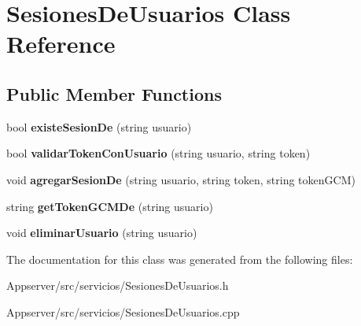 \hypertarget{classSesionesDeUsuarios}{}\section{Sesiones\+De\+Usuarios Class Reference}
\label{classSesionesDeUsuarios}
\subsection*{Public Member Functions}
\begin{DoxyCompactItemize}
\item 
bool {\bfseries existe\+Sesion\+De} (string usuario)\hypertarget{classSesionesDeUsuarios_a367c440abe4664555d0e0715fbe251d2}{}\label{classSesionesDeUsuarios_a367c440abe4664555d0e0715fbe251d2}

\item 
bool {\bfseries validar\+Token\+Con\+Usuario} (string usuario, string token)\hypertarget{classSesionesDeUsuarios_a3f3e9390119bb3993b0f49241058d892}{}\label{classSesionesDeUsuarios_a3f3e9390119bb3993b0f49241058d892}

\item 
void {\bfseries agregar\+Sesion\+De} (string usuario, string token, string token\+G\+CM)\hypertarget{classSesionesDeUsuarios_a84372449c2bdd392c28b8a57ced54a12}{}\label{classSesionesDeUsuarios_a84372449c2bdd392c28b8a57ced54a12}

\item 
string {\bfseries get\+Token\+G\+C\+M\+De} (string usuario)\hypertarget{classSesionesDeUsuarios_adb30d93c8b85a1bd1471cc4c04dc9886}{}\label{classSesionesDeUsuarios_adb30d93c8b85a1bd1471cc4c04dc9886}

\item 
void {\bfseries eliminar\+Usuario} (string usuario)\hypertarget{classSesionesDeUsuarios_a31c8968740a0c1414035ce719d3f1e1a}{}\label{classSesionesDeUsuarios_a31c8968740a0c1414035ce719d3f1e1a}

\end{DoxyCompactItemize}


The documentation for this class was generated from the following files\+:\begin{DoxyCompactItemize}
\item 
Appserver/src/servicios/Sesiones\+De\+Usuarios.\+h\item 
Appserver/src/servicios/Sesiones\+De\+Usuarios.\+cpp\end{DoxyCompactItemize}
